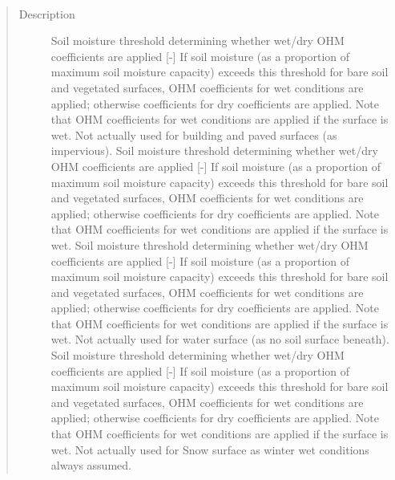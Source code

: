 \documentclass[letterpaper,10pt,english]{sphinxmanual}
\begin{document}
\begin{fulllineitems}
\begin{quote}
\begin{description}
\end{description}\end{quote}

\end{fulllineitems}


\begin{fulllineitems}
\label{\detokenize{input_files/SUEWS_SiteInfo/Input_Options:cmdoption-arg-ohmthresh-wd}}~\begin{quote}\begin{description}
\item[{Description}] \leavevmode
Soil moisture threshold determining whether wet/dry OHM coefficients are applied {[}-{]} If soil moisture (as a proportion of maximum soil moisture capacity) exceeds this threshold for bare soil and vegetated surfaces, OHM coefficients for wet conditions are applied; otherwise coefficients for dry coefficients are applied. Note that OHM coefficients for wet conditions are applied if the surface is wet. Not actually used for building and paved surfaces (as impervious).  Soil moisture threshold determining whether wet/dry OHM coefficients are applied {[}-{]} If soil moisture (as a proportion of maximum soil moisture capacity) exceeds this threshold for bare soil and vegetated surfaces, OHM coefficients for wet conditions are applied; otherwise coefficients for dry coefficients are applied. Note that OHM coefficients for wet conditions are applied if the surface is wet.  Soil moisture threshold determining whether wet/dry OHM coefficients are applied {[}-{]} If soil moisture (as a proportion of maximum soil moisture capacity) exceeds this threshold for bare soil and vegetated surfaces, OHM coefficients for wet conditions are applied; otherwise coefficients for dry coefficients are applied. Note that OHM coefficients for wet conditions are applied if the surface is wet. Not actually used for water surface (as no soil surface beneath).  Soil moisture threshold determining whether wet/dry OHM coefficients are applied {[}-{]} If soil moisture (as a proportion of maximum soil moisture capacity) exceeds this threshold for bare soil and vegetated surfaces, OHM coefficients for wet conditions are applied; otherwise coefficients for dry coefficients are applied. Note that OHM coefficients for wet conditions are applied if the surface is wet. Not actually used for Snow surface as winter wet conditions always assumed.


\end{description}
\end{quote}
\end{fulllineitems}
\end{document}
